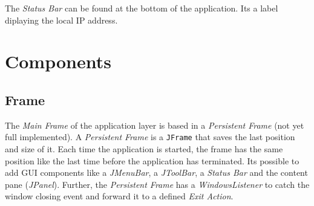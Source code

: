 The \textit{Status Bar} can be found at the bottom of the application. Its a label diplaying the local IP address.

\section{Components}
\label{applicationlayer_component_desc}

\subsection{Frame}
\label{applicationlayer_frame_desc}
The \textit{Main Frame} of the application layer is based in a \textit{Persistent Frame} (not yet full implemented). A \textit{Persistent Frame} is a \texttt{JFrame} that saves the last position and size of it. Each time the application is started, the frame has the same position like the last time before the application has terminated. Its possible to add GUI components like a \textit{JMenuBar}, a \textit{JToolBar}, a \textit{Status Bar} and the content pane (\textit{JPanel}). Further, the \textit{Persistent Frame} has a \textit{WindowsListener} to catch the window closing event and forward it to a defined \textit{Exit Action}.

